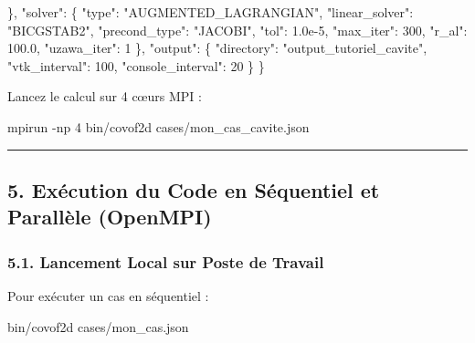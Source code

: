 \documentclass[
  french,
]{article}
\newenvironment{Shaded}{}{}
\newcommand{\AttributeTok}[1]{\textcolor[rgb]{0.49,0.56,0.16}{#1}}
\newcommand{\DataTypeTok}[1]{\textcolor[rgb]{0.56,0.13,0.00}{#1}}
\newcommand{\DecValTok}[1]{\textcolor[rgb]{0.25,0.63,0.44}{#1}}
\newcommand{\ExtensionTok}[1]{#1}
\newcommand{\FloatTok}[1]{\textcolor[rgb]{0.25,0.63,0.44}{#1}}
\newcommand{\FunctionTok}[1]{\textcolor[rgb]{0.02,0.16,0.49}{#1}}
\newcommand{\NormalTok}[1]{#1}
\newcommand{\StringTok}[1]{\textcolor[rgb]{0.25,0.44,0.63}{#1}}
\begin{document}
\begin{Shaded}
\begin{Highlighting}[]
  \FunctionTok{\},}
  \DataTypeTok{"solver"}\FunctionTok{:} \FunctionTok{\{}
    \DataTypeTok{"type"}\FunctionTok{:} \StringTok{"AUGMENTED\_LAGRANGIAN"}\FunctionTok{,}
    \DataTypeTok{"linear\_solver"}\FunctionTok{:} \StringTok{"BICGSTAB2"}\FunctionTok{,}
    \DataTypeTok{"precond\_type"}\FunctionTok{:} \StringTok{"JACOBI"}\FunctionTok{,}
    \DataTypeTok{"tol"}\FunctionTok{:} \FloatTok{1.0e{-}5}\FunctionTok{,}
    \DataTypeTok{"max\_iter"}\FunctionTok{:} \DecValTok{300}\FunctionTok{,}
    \DataTypeTok{"r\_al"}\FunctionTok{:} \FloatTok{100.0}\FunctionTok{,}
    \DataTypeTok{"uzawa\_iter"}\FunctionTok{:} \DecValTok{1}
  \FunctionTok{\},}
  \DataTypeTok{"output"}\FunctionTok{:} \FunctionTok{\{}
    \DataTypeTok{"directory"}\FunctionTok{:} \StringTok{"output\_tutoriel\_cavite"}\FunctionTok{,}
    \DataTypeTok{"vtk\_interval"}\FunctionTok{:} \DecValTok{100}\FunctionTok{,}
    \DataTypeTok{"console\_interval"}\FunctionTok{:} \DecValTok{20}
  \FunctionTok{\}}
\FunctionTok{\}}
\end{Highlighting}
\end{Shaded}

Lancez le calcul sur 4 cœurs MPI :

\begin{Shaded}
\begin{Highlighting}[]
\ExtensionTok{mpirun} \AttributeTok{{-}np}\NormalTok{ 4 bin/covof2d cases/mon\_cas\_cavite.json}
\end{Highlighting}
\end{Shaded}

\begin{center}\rule{0.5\linewidth}{0.5pt}\end{center}

\subsection{5. Exécution du Code en Séquentiel et Parallèle
(OpenMPI)}\label{exuxe9cution-du-code-en-suxe9quentiel-et-paralluxe8le-openmpi}

\subsubsection{5.1. Lancement Local sur Poste de
Travail}\label{lancement-local-sur-poste-de-travail}

Pour exécuter un cas en séquentiel :

\begin{Shaded}
\begin{Highlighting}[]
\ExtensionTok{bin/covof2d}\NormalTok{ cases/mon\_cas.json}
\end{Highlighting}
\end{Shaded}
\end{document}
